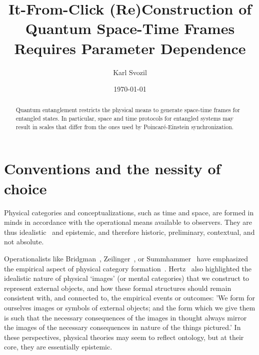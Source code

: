 \documentclass[%
  reprint,
 showpacs,
 showkeys,
 preprintnumbers,
 nofootinbib,
 amsmath,amssymb,
 aps,
 pra,
  longbibliography,
 ]{revtex4-2}
\begin{document}
\title{It-From-Click (Re)Construction of Quantum Space-Time Frames Requires Parameter Dependence}


\author{Karl Svozil}



\date{\today}

\begin{abstract}
Quantum entanglement restricts the physical means to generate space-time frames for entangled states. In particular, space and time protocols for entangled systems may result in scales that differ from the ones used by Poincar\'e-Einstein synchronization.
\end{abstract}



\maketitle


\section{Conventions and the nessity of choice}

Physical categories and conceptualizations, such as time and space,
are formed in minds in accordance with the operational means available to observers.
They are thus idealistic~\cite{stace1} and epistemic, and therefore historic, preliminary, contextual, and not absolute.


Operationalists like Bridgman~\cite{bridgman36}, Zeilinger~\cite{sv1,zeil-99}, or Summhammer~\cite{Summhammer_1994}
have emphasized the empirical aspect of physical category formation~\cite{Hardy_2007}.
Hertz~\cite{hertz-94e} also highlighted the idealistic nature of physical `images' (or mental categories)
that we construct to represent external objects,
and how these formal structures should remain consistent with, and connected to, the empirical events or outcomes:
'We form for ourselves images or symbols of external objects; and the form which we give them is such that the necessary
consequences of the images in thought always mirror the images of the necessary consequences in nature of the things pictured.'
In these perspectives, physical theories may seem to reflect ontology, but at their core, they are essentially epistemic.
\end{document}
